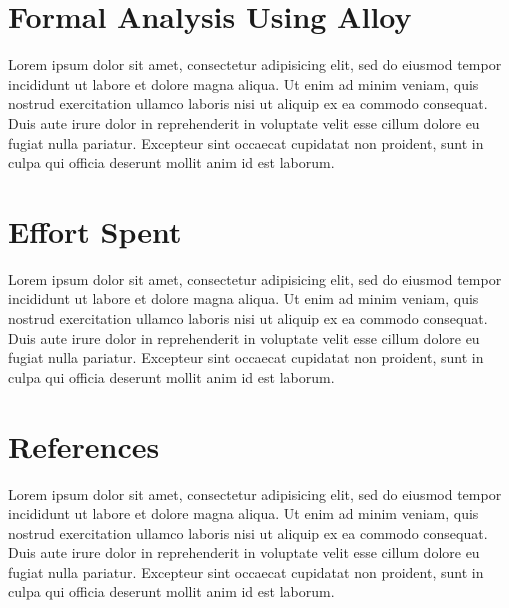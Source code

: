 \documentclass{report}
\begin{document}
	
	\chapter{Formal Analysis Using Alloy}
	Lorem ipsum dolor sit amet, consectetur adipisicing elit, sed do eiusmod
	tempor incididunt ut labore et dolore magna aliqua. Ut enim ad minim veniam,
	quis nostrud exercitation ullamco laboris nisi ut aliquip ex ea commodo
	consequat. Duis aute irure dolor in reprehenderit in voluptate velit esse
	cillum dolore eu fugiat nulla pariatur. Excepteur sint occaecat cupidatat non
	proident, sunt in culpa qui officia deserunt mollit anim id est laborum.
	
	
	\chapter{Effort Spent}
	Lorem ipsum dolor sit amet, consectetur adipisicing elit, sed do eiusmod
	tempor incididunt ut labore et dolore magna aliqua. Ut enim ad minim veniam,
	quis nostrud exercitation ullamco laboris nisi ut aliquip ex ea commodo
	consequat. Duis aute irure dolor in reprehenderit in voluptate velit esse
	cillum dolore eu fugiat nulla pariatur. Excepteur sint occaecat cupidatat non
	proident, sunt in culpa qui officia deserunt mollit anim id est laborum.
	
	
	\chapter{References}
	Lorem ipsum dolor sit amet, consectetur adipisicing elit, sed do eiusmod
	tempor incididunt ut labore et dolore magna aliqua. Ut enim ad minim veniam,
	quis nostrud exercitation ullamco laboris nisi ut aliquip ex ea commodo
	consequat. Duis aute irure dolor in reprehenderit in voluptate velit esse
	cillum dolore eu fugiat nulla pariatur. Excepteur sint occaecat cupidatat non
	proident, sunt in culpa qui officia deserunt mollit anim id est laborum.
	
\end{document}
